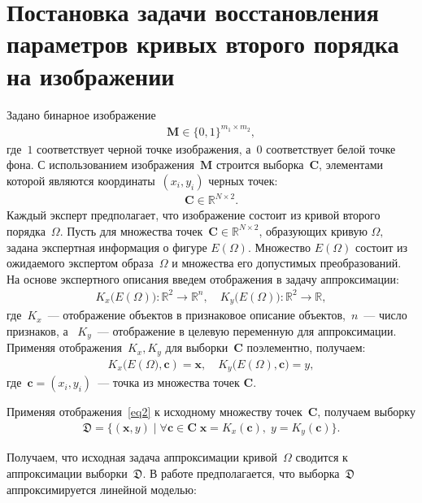 \documentclass[12pt]{a&t}
\begin{document}
\section{Постановка задачи восстановления параметров кривых второго порядка на изображении}
Задано бинарное изображение
\begin{gather}
\mathbf{M} \in \{0, 1 \}^{m_1\times m_2},
\end{gather}
где~$1$ соответствует черной точке изображения, а~$0$ соответствует белой точке фона.
С использованием изображения~$\mathbf{M}$ строится выборка~$\mathbf{C}$, элементами которой являются координаты~$(x_i, y_i)$ черных точек:
\begin{gather}
\mathbf{C} \in \mathbb{R}^{N \times 2}.
\end{gather}
Каждый эксперт предполагает, что изображение состоит из кривой второго порядка~$\Omega$.
Пусть для множества точек~$\mathbf {C} \in \mathbb{R}^{N \times 2} $, образующих кривую $\Omega,$ задана экспертная информация о фигуре $E(\Omega)$.
Множество $E(\Omega)$ состоит из ожидаемого экспертом образа~$\Omega$ и множества его допустимых преобразований. На основе экспертного описания введем отображения в задачу аппроксимации:
\begin{gather}
\label{eq1}
	K_{x}\bigl(E(\Omega)\bigr): \mathbb{R}^{2} \rightarrow \mathbb{R}^{n}, \quad K_{y}\bigl(E(\Omega)\bigr): \mathbb{R}^{2} \rightarrow \mathbb{R},
\end{gather} 
где~$K_{x}$~--- отображение объектов в признаковое описание объектов,~$n$~--- число признаков, а ~$K_{y}$~---  отображение в целевую переменную для аппроксимации. Применяя отображения~$K_{x}, K_{y}$ для выборки~$\mathbf{C}$ поэлементно, получаем:
\begin{gather}
\label{eq2}
	K_{x}\bigl(E(\Omega\bigr), \mathbf{c}) = \mathbf{x}, \quad  K_{y}\bigl(E(\Omega), \mathbf{c}\bigr) = y,
\end{gather}
где~$\mathbf{c} = (x_i, y_i)$~--- точка из множества точек $\mathbf{C}$.

Применяя отображения~\eqref{eq2} к исходному множеству точек~$\mathbf{C}$, получаем выборку
\begin{gather}
\label{eq4}
    \mathfrak{D} = \{(\mathbf{x}, y) \; | \; \forall \mathbf{c} \in \mathbf{C} \; \mathbf{x} = K_x(\mathbf{c}), \; y = K_y(\mathbf{c}) \}.
\end{gather}

Получаем, что исходная задача аппроксимации кривой~$\Omega$ сводится к аппроксимации выборки~$\mathfrak{D}$. В работе предполагается, что выборка~$\mathfrak{D}$ аппроксимируется линейной моделью:
\end{document}
